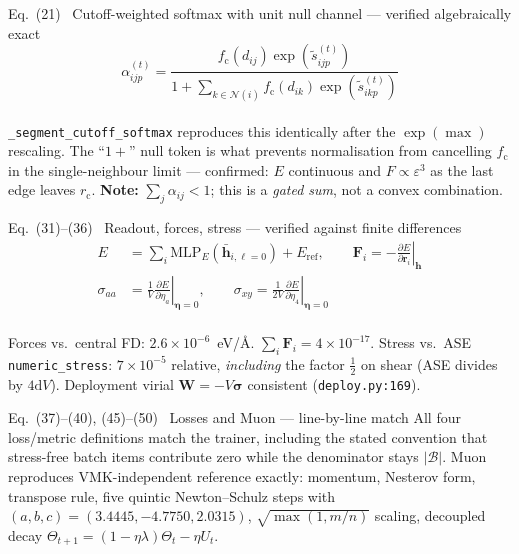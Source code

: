 \documentclass[10pt,a4paper]{article}
\newcommand{\OK}[1]{\textcolor{OKgreen}{#1}}
\newcommand{\rr}{\bm{r}}
\newcommand{\hh}{\bm{h}}
\newcommand{\code}[1]{\texttt{\small #1}}
\begin{document}
\begin{okbox}{Eq.~(21) \ Cutoff-weighted softmax with unit null channel --- verified algebraically exact}
\vspace{-6pt}
\begin{equation*}
\alpha^{(t)}_{ijp} = \frac{f_{\mathrm c}(d_{ij})\exp(\tilde s^{(t)}_{ijp})}
{1 + \sum_{k\in\mathcal N(i)} f_{\mathrm c}(d_{ik})\exp(\tilde s^{(t)}_{ikp})}
\end{equation*}
\vspace{-10pt}\\
\footnotesize\OK{\code{\_segment\_cutoff\_softmax} reproduces this identically after the
$\exp(\max)$ rescaling. The ``$1+$'' null token is what prevents normalisation from
cancelling $f_{\mathrm c}$ in the single-neighbour limit --- confirmed: $E$ continuous and
$F\propto\varepsilon^3$ as the last edge leaves $r_{\mathrm c}$.
\textbf{Note:} $\sum_j\alpha_{ij}<1$; this is a \emph{gated sum}, not a convex combination.}
\end{okbox}

\begin{okbox}{Eq.~(31)--(36) \ Readout, forces, stress --- verified against finite differences}
\vspace{-6pt}
\begin{align*}
E &= \sum_i \mathrm{MLP}_E(\bar{\hh}_{i,\ell=0}) + E_{\mathrm{ref}},\qquad
\bm F_i = -\left.\frac{\partial E}{\partial\rr_i}\right|_{\bm h}\\
\sigma_{aa} &= \frac1V\left.\frac{\partial E}{\partial\eta_a}\right|_{\bm\eta=0},\qquad
\sigma_{xy} = \frac{1}{2V}\left.\frac{\partial E}{\partial\eta_4}\right|_{\bm\eta=0}
\end{align*}
\vspace{-10pt}\\
\footnotesize\OK{Forces vs.\ central FD: $2.6\times10^{-6}$~eV/\AA. $\sum_i\bm F_i = 4\times10^{-17}$.
Stress vs.\ ASE \code{numeric\_stress}: $7\times10^{-5}$ relative, \emph{including} the
factor $\tfrac12$ on shear (ASE divides by $4\mathrm dV$). Deployment virial
$\bm W=-V\bm\sigma$ consistent (\code{deploy.py:169}).}
\end{okbox}

\begin{okbox}{Eq.~(37)--(40), (45)--(50) \ Losses and Muon --- line-by-line match}
\footnotesize\OK{All four loss/metric definitions match the trainer, including the stated
convention that stress-free batch items contribute zero while the denominator stays
$|\mathcal B|$. Muon reproduces VMK-independent reference exactly: momentum, Nesterov
form, transpose rule, five quintic Newton--Schulz steps with $(a,b,c)=(3.4445,-4.7750,2.0315)$,
$\sqrt{\max(1,m/n)}$ scaling, decoupled decay $\Theta_{t+1}=(1-\eta\lambda)\Theta_t-\eta U_t$.}
\end{okbox}
\end{document}
